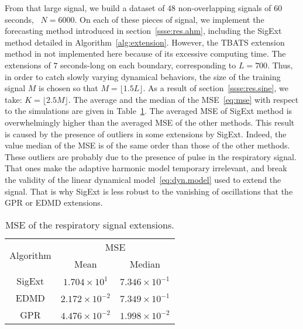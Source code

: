 From that large signal, we build a dataset of $48$ non-overlapping signals of 60 seconds, \ie~$N=6000$. On each of these pieces of signal, we implement the forecasting method introduced in section~\ref{ssse:res.ahm}, including the {\sf SigExt} method detailed in Algorithm~\ref{alg:extension}. However, the TBATS extension method in not implemented here because of its excessive computing time. The extensions of $7$ seconds-long on each boundary, corresponding to $L =700$. Thus, in order to catch slowly varying dynamical behaviors, the size of the training signal $M$ is chosen so that $M=\lfloor 1.5L\rfloor$. As a result of section~\ref{ssse:res.sine}, we take: $K=\lfloor2.5M\rfloor$. The average and the median of the MSE~\eqref{eq:mse} with respect to the simulations are given in Table~\ref{tab:mse}. The averaged MSE of {\sf SigExt} method is overwhelmingly higher than the averaged MSE of the other methods. This result is caused by the presence of outliers in some extensions by {\sf SigExt}. Indeed, the value median of the MSE is of the same order than those of the other methods. These outliers are probably due to the presence of pulse in the respiratory signal. That ones make the adaptive harmonic model temporary irrelevant, and break the validity of the linear dynamical model~\eqref{eq:dyn.model} used to extend the signal. That is why {\sf SigExt} is less robust to the vanishing of oscillations that the GPR or EDMD extensions.

\begin{table}
\centering
\caption{MSE of the respiratory signal extensions.}
\begin{tabular}{|c||c|c|}
  \hline
   \multirow{2}{*}{Algorithm} & \multicolumn{2}{c|}{MSE} \\
   \cline{2-3}
      & Mean & Median\\
   \hhline{|=#=|=|}
   {\sf SigExt} & $1.704 \times 10^{1}$ & $7.346 \times 10^{-1}$ \\
   \hline
   EDMD & $2.172\times 10^{-2}$ & $7.349\times 10^{-1}$ \\
   \hline
   GPR & $4.476\times 10^{-2}$ & $1.998\times 10^{-2}$ \\
   \hline
\end{tabular}
\label{tab:mse}
\end{table} 

